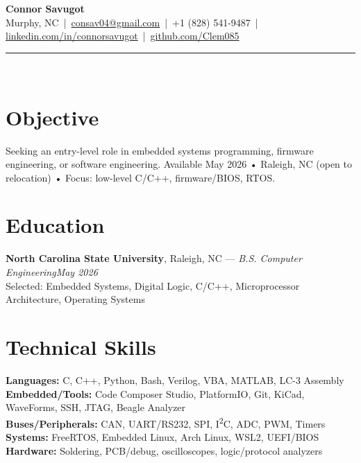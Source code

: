 \documentclass[10pt,letterpaper]{article}
\newcommand{\header}[5]{%
  {\LARGE \textbf{#1}}\\[-1pt]
  {\small #2 \,|\, \href{mailto:#3}{#3} \,|\, #4 \,|\, 
  \href{https://linkedin.com/in/#5}{linkedin.com/in/#5} \,|\, 
  \href{https://github.com/Clem085}{github.com/Clem085}}\\[6pt]
  {\noindent\rule{\linewidth}{0.6pt}}\\[-8pt]
}
\begin{document}
\header{\color{blue}Connor Savugot}{Murphy, NC}{consav04@gmail.com}{+1 (828) 541-9487}{connorsavugot}

\section*{Objective}
Seeking an entry-level role in embedded systems programming, firmware engineering, or software engineering. {\small Available May 2026 • Raleigh, NC (open to relocation) • Focus: low-level C/C++, firmware/BIOS, RTOS.}


\section*{Education}
\noindent\textbf{North Carolina State University}, Raleigh, NC — \textit{B.S. Computer Engineering}\hfill \textit{May 2026}\\
{\small Selected: Embedded Systems, Digital Logic, C/C++, Microprocessor Architecture, Operating Systems}
\section*{Technical Skills}
\textbf{Languages:} C, C++, Python, Bash, Verilog, VBA, MATLAB, LC-3 Assembly \\
\textbf{Embedded/Tools:} Code Composer Studio, PlatformIO, Git, KiCad, WaveForms, SSH, JTAG, Beagle Analyzer \\
\textbf{Buses/Peripherals:} CAN, UART/RS232, SPI, I\textsuperscript{2}C, ADC, PWM, Timers \\
\textbf{Systems:} FreeRTOS, Embedded Linux, Arch Linux, WSL2, UEFI/BIOS \\
\textbf{Hardware:} Soldering, PCB/debug, oscilloscopes, logic/protocol analyzers

\end{document}
